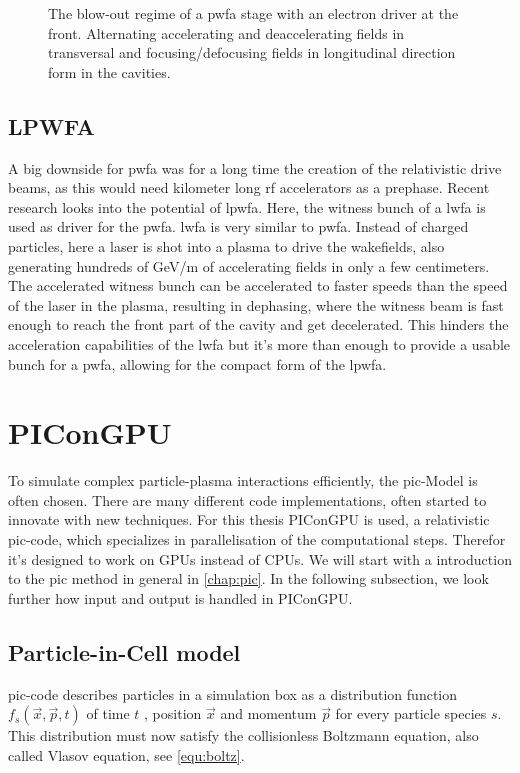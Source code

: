 \documentclass[bachelor_thesis]{subfiles}
\begin{document}
\begin{figure}
	\centering
	\missingfigure{}
	\caption{The blow-out regime of a \gls{pwfa} stage with an electron driver at the front. Alternating accelerating and deaccelerating fields in transversal and focusing/defocusing fields in longitudinal direction form in the cavities.}
	\label{fig:pwfa}
\end{figure} 

\subsection{LPWFA} \label{chap:lpfwa}
A big downside for \gls{pwfa} was for a long time the creation of the relativistic drive beams, as this would need kilometer long \gls{rf} accelerators as a prephase. Recent research \cite{Kurz2021} looks into the potential of \gls{lpwfa}.
Here, the witness bunch of a \gls{lwfa} is used as driver for the \gls{pwfa}. \Gls{lwfa} is very similar to \gls{pwfa}. Instead of charged particles, here a laser is shot into a plasma to drive the wakefields, also generating hundreds of \unit{\GeV/\m} of accelerating fields in only a few centimeters.
The accelerated witness bunch can be accelerated to faster speeds than the speed of the laser in the plasma, resulting in dephasing, where the witness beam is fast enough to reach the front part of the cavity and get decelerated. This hinders the acceleration capabilities of the \gls{lwfa} but it's
more than enough to provide a usable bunch for a \gls{pwfa}, allowing for the compact form of the \gls{lpwfa}.

\section{PIConGPU}
To simulate complex particle-plasma interactions efficiently, the \gls{pic}-Model is often chosen. There are many different code implementations, often started to innovate with new techniques. For this thesis PIConGPU \cite{PIConGPU2013, PICRepo} is used, 
a relativistic \gls{pic}-code, which specializes in parallelisation of the computational steps. Therefor it's designed to work on GPUs instead of CPUs. We will start with a introduction to the \gls{pic} method in general in \autoref{chap:pic}.
In the following subsection, we look further how input and output is handled in PIConGPU.

\subsection{Particle-in-Cell model} \label{chap:pic}
\Gls{pic}-code describes particles in a simulation box as a distribution function $f_s(\vec{x}, \vec{p}, t)$ of time $t$ , position $\vec{x}$ and momentum $\vec{p}$ for every particle species $s$.
This distribution must now satisfy the collisionless Boltzmann equation, also called Vlasov equation\cite{Vlasov1968}, see \autoref{equ:boltz}.
\end{document}
